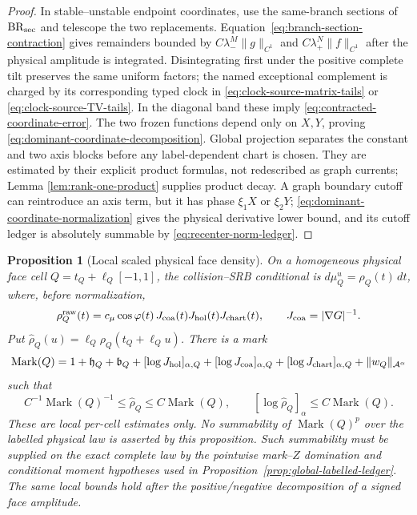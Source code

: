 \documentclass[11pt]{article}
\newtheorem{proposition}[theorem]{Proposition}
\begin{document}
\begin{proof}
In stable--unstable endpoint coordinates, use the same-branch sections of
$\mathrm{BR}_{\rm sec}$ and telescope the two replacements.
Equation~\eqref{eq:branch-section-contraction} gives remainders bounded by
$C\lambda_-^M\|g\|_{C^1}$ and $C\lambda_+^N\|f\|_{C^1}$ after the physical
amplitude is integrated.  Disintegrating first under the positive complete
tilt preserves the same uniform factors; the named exceptional complement is
charged by its corresponding typed clock in
\eqref{eq:clock-source-matrix-tails} or
\eqref{eq:clock-source-TV-tails}.  In the diagonal band these imply
\eqref{eq:contracted-coordinate-error}.  The two frozen functions depend
only on $X,Y$, proving \eqref{eq:dominant-coordinate-decomposition}.  Global
projection separates the constant and two axis blocks before any
label-dependent chart is chosen.  They are estimated by their explicit
product formulas, not redescribed as graph currents; Lemma
\ref{lem:rank-one-product} supplies product decay.  A graph boundary
cutoff can reintroduce an axis term, but it has phase $\xi_1X$ or $\xi_2Y$;
\eqref{eq:dominant-coordinate-normalization} gives the physical derivative
lower bound, and its cutoff ledger is absolutely summable by
\eqref{eq:recenter-norm-ledger}.
\end{proof}

\begin{proposition}[Local scaled physical face density]
\label{prop:scaled-face-density}
On a homogeneous physical face cell
\(Q=t_Q+\ell_Q[-1,1]\), the collision--SRB conditional is
\(d\mu_Q^u=\rho_Q(t)\,dt\), where, before normalization,
\begin{equation}
\label{eq:face-conditional-density}
 \rho_Q^{\rm raw}(t)=c_\mu\cos\varphi(t)\,J_{\rm coa}(t)
 J_{\rm hol}(t)J_{\rm chart}(t),
 \qquad J_{\rm coa}=|\nabla G|^{-1}.
\end{equation}
Put
\(\widehat\rho_Q(u)=\ell_Q\rho_Q(t_Q+\ell_Qu)\).  There is a mark
\begin{equation}
\label{eq:density-mark-definition}
 \operatorname{Mark}(Q)=
 1+\mathfrak h_Q+\mathfrak b_Q+
 [\log J_{\rm hol}]_{\alpha,Q}
 +[\log J_{\rm coa}]_{\alpha,Q}
 +[\log J_{\rm chart}]_{\alpha,Q}
 +\|w_Q\|_{\mathcal A^\alpha}
\end{equation}
such that
\begin{equation}
\label{eq:scaled-density-bound}
 C^{-1}\operatorname{Mark}(Q)^{-1}
 \le\widehat\rho_Q\le C\operatorname{Mark}(Q),\qquad
 [\log\widehat\rho_Q]_\alpha
 \le C\operatorname{Mark}(Q).
\end{equation}
These are local per-cell estimates only.  No summability of
$\operatorname{Mark}(Q)^p$ over the labelled physical law is asserted by this
proposition.  Such summability must be supplied on the exact complete law by
the pointwise mark--$Z$ domination and conditional moment hypotheses used in
Proposition~\ref{prop:global-labelled-ledger}.  The same local bounds hold
after the positive/negative decomposition of a signed face amplitude.
\end{proposition}
\end{document}
